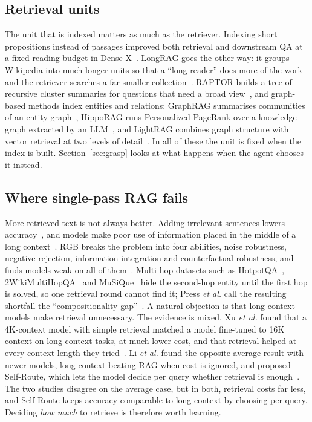 \documentclass[pdflatex,sn-mathphys-num]{sn-jnl}%
\begin{document}
\subsection{Retrieval units}
The unit that is indexed matters as much as the retriever. Indexing short propositions instead of passages improved both retrieval and downstream QA at a fixed reading budget in Dense X~\cite{chen2024densex}. LongRAG goes the other way: it groups Wikipedia into much longer units so that a ``long reader'' does more of the work and the retriever searches a far smaller collection~\cite{jiang2024longrag}. RAPTOR builds a tree of recursive cluster summaries for questions that need a broad view~\cite{sarthi2024raptor}, and graph-based methods index entities and relations: GraphRAG summarises communities of an entity graph~\cite{edge2024graphrag}, HippoRAG runs Personalized PageRank over a knowledge graph extracted by an LLM~\cite{gutierrez2024hipporag}, and LightRAG combines graph structure with vector retrieval at two levels of detail~\cite{guo2024lightrag}. In all of these the unit is fixed when the index is built. Section~\ref{sec:grasp} looks at what happens when the agent chooses it instead.

\subsection{Where single-pass RAG fails}
More retrieved text is not always better. Adding irrelevant sentences lowers accuracy~\cite{shi2023distracted}, and models make poor use of information placed in the middle of a long context~\cite{liu2024lost}. RGB breaks the problem into four abilities, noise robustness, negative rejection, information integration and counterfactual robustness, and finds models weak on all of them~\cite{chen2024rgb}. Multi-hop datasets such as HotpotQA~\cite{yang2018hotpotqa}, 2WikiMultiHopQA~\cite{ho2020twowiki} and MuSiQue~\cite{trivedi2022musique} hide the second-hop entity until the first hop is solved, so one retrieval round cannot find it; Press \textit{et al.} call the resulting shortfall the ``compositionality gap''~\cite{press2023selfask}. A natural objection is that long-context models make retrieval unnecessary. The evidence is mixed. Xu \textit{et al.} found that a 4K-context model with simple retrieval matched a model fine-tuned to 16K context on long-context tasks, at much lower cost, and that retrieval helped at every context length they tried~\cite{xu2024retrievalmeetslong}. Li \textit{et al.} found the opposite average result with newer models, long context beating RAG when cost is ignored, and proposed Self-Route, which lets the model decide per query whether retrieval is enough~\cite{li2024ragvslc}. The two studies disagree on the average case, but in both, retrieval costs far less, and Self-Route keeps accuracy comparable to long context by choosing per query. Deciding \emph{how much} to retrieve is therefore worth learning.
\end{document}
